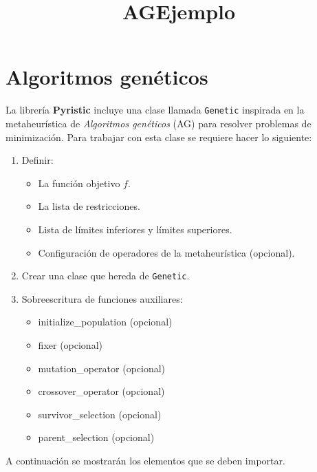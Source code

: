\documentclass[11pt]{article}
\title{AGEjemplo}
\providecommand{\tightlist}{%
      \setlength{\itemsep}{0pt}\setlength{\parskip}{0pt}}
\begin{document}
    
    
    \maketitle
    
    

    
    \section{Algoritmos genéticos}\label{algoritmos-genuxe9ticos}

La librería \textbf{Pyristic} incluye una clase llamada \texttt{Genetic}
inspirada en la metaheurística de \emph{Algoritmos genéticos} (AG) para
resolver problemas de minimización. Para trabajar con esta clase se
requiere hacer lo siguiente:

\begin{enumerate}
\def\labelenumi{\arabic{enumi}.}
\item
  Definir:

  \begin{itemize}
  \tightlist
  \item
    La función objetivo \(f\).
  \item
    La lista de restricciones.
  \item
    Lista de límites inferiores y límites superiores.
  \item
    Configuración de operadores de la metaheurística (opcional).
  \end{itemize}
\item
  Crear una clase que hereda de \texttt{Genetic}.
\item
  Sobreescritura de funciones auxiliares:

  \begin{itemize}
  \tightlist
  \item
    initialize\_population (opcional)
  \item
    fixer (opcional)
  \item
    mutation\_operator (opcional)
  \item
    crossover\_operator (opcional)
  \item
    survivor\_selection (opcional)
  \item
    parent\_selection (opcional)
  \end{itemize}
\end{enumerate}

A continuación se mostrarán los elementos que se deben importar.
\end{document}
